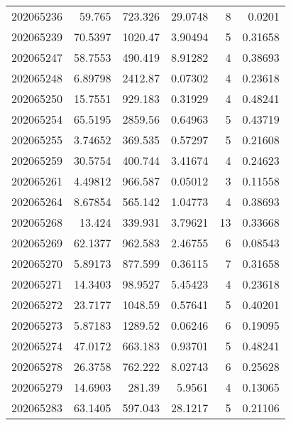 \begin{tabular}{rrrrrr}
 202065236 &         59.765   &      723.326  &           29.0748  &           8 & 0.0201  \\
 202065239 &         70.5397  &     1020.47   &            3.90494 &           5 & 0.31658 \\
 202065247 &         58.7553  &      490.419  &            8.91282 &           4 & 0.38693 \\
 202065248 &          6.89798 &     2412.87   &            0.07302 &           4 & 0.23618 \\
 202065250 &         15.7551  &      929.183  &            0.31929 &           4 & 0.48241 \\
 202065254 &         65.5195  &     2859.56   &            0.64963 &           5 & 0.43719 \\
 202065255 &          3.74652 &      369.535  &            0.57297 &           5 & 0.21608 \\
 202065259 &         30.5754  &      400.744  &            3.41674 &           4 & 0.24623 \\
 202065261 &          4.49812 &      966.587  &            0.05012 &           3 & 0.11558 \\
 202065264 &          8.67854 &      565.142  &            1.04773 &           4 & 0.38693 \\
 202065268 &         13.424   &      339.931  &            3.79621 &          13 & 0.33668 \\
 202065269 &         62.1377  &      962.583  &            2.46755 &           6 & 0.08543 \\
 202065270 &          5.89173 &      877.599  &            0.36115 &           7 & 0.31658 \\
 202065271 &         14.3403  &       98.9527 &            5.45423 &           4 & 0.23618 \\
 202065272 &         23.7177  &     1048.59   &            0.57641 &           5 & 0.40201 \\
 202065273 &          5.87183 &     1289.52   &            0.06246 &           6 & 0.19095 \\
 202065274 &         47.0172  &      663.183  &            0.93701 &           5 & 0.48241 \\
 202065278 &         26.3758  &      762.222  &            8.02743 &           6 & 0.25628 \\
 202065279 &         14.6903  &      281.39   &            5.9561  &           4 & 0.13065 \\
 202065283 &         63.1405  &      597.043  &           28.1217  &           5 & 0.21106 \\

\end{tabular}
